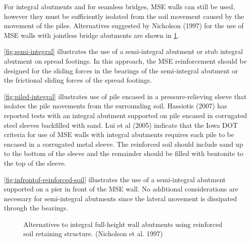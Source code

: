 For integral abutments and for seamless bridges, MSE walls can still be used, however they must be sufficiently isolated from the soil movement caused by the movement of the piles. Alternatives suggested by Nicholson (1997) for the use of MSE walls with jointless bridge abutments are shown in \cref{fig:integral-full-height-wall}.

\cref{fig:semi-integral} illustrates the use of a semi-integral abutment or stub integral abutment on spread footings. In this approach, the MSE reinforcement should be designed for the sliding forces in the bearings of the semi-integral abutment or the frictional sliding forces of the spread footings.

\cref{fig:piled-integral} illustrates use of pile encased in a pressure-relieving sleeve that isolates the pile movements from the surrounding soil. Hassiotis (2007) has reported tests with an integral abutment supported on pile encased in corrugated steel sleeves backfilled with sand. Lui et al (2005) indicate that the Iowa DOT criteria for use of MSE walls with integral abutments requires each pile to be encased in a corrugated metal sleeve. The reinforced soil should include sand up to the bottom of the sleeve and the remainder should be filled with bentonite to the top of the sleeve.

\cref{fig:infrontof-reinforced-soil} illustrates the use of a semi-integral abutment supported on a pier in front of the MSE wall. No additional considerations are necessary for semi-integral abutments since the lateral movement is dissipated through the bearings.

\begin{figure}
  \begin{minipage}{0.5\linewidth}
    \label{fig:semi-integral}
  \end{minipage}%
  \begin{minipage}{0.5\linewidth}\centering
  \end{minipage}
  \begin{minipage}{0.5\linewidth}
    \label{fig:piled-integral}
  \end{minipage}%
  \begin{minipage}{0.5\linewidth}\centering
  \end{minipage}
  \begin{minipage}{0.5\linewidth}
    \label{fig:infrontof-reinforced-soil}
  \end{minipage}%
  \begin{minipage}{0.5\linewidth}\centering
  \end{minipage}
  \caption{Alternatives to integral full-height wall abutments using reinforced soil retaining structure. (Nicholson et
  al. 1997)}
  \label{fig:integral-full-height-wall}
\end{figure}

